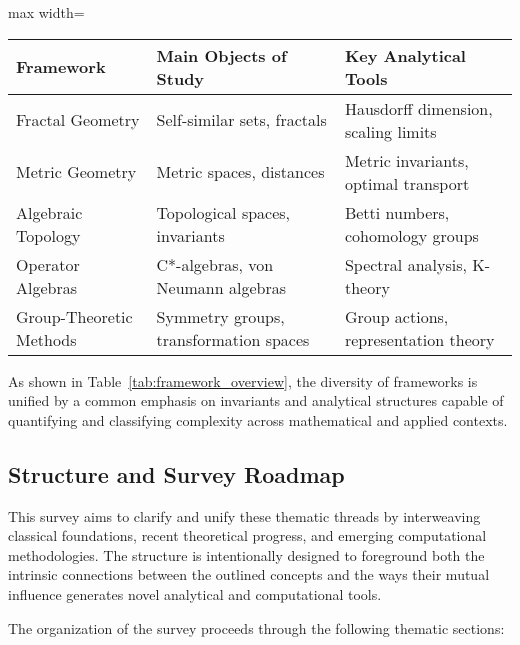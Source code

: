 \documentclass[sigconf]{acmart}
\begin{document}
\begin{table*}[htbp]
\centering
\caption{Principal Frameworks, Core Objects, and Key Analytical Tools}
\label{tab:framework_overview}
\begin{adjustbox}{max width=\textwidth}
\begin{tabular}{lll}
\toprule
\textbf{Framework}         & \textbf{Main Objects of Study}         & \textbf{Key Analytical Tools}             \\
\midrule
Fractal Geometry           & Self-similar sets, fractals            & Hausdorff dimension, scaling limits       \\
Metric Geometry            & Metric spaces, distances                & Metric invariants, optimal transport      \\
Algebraic Topology         & Topological spaces, invariants          & Betti numbers, cohomology groups          \\
Operator Algebras          & C*-algebras, von Neumann algebras       & Spectral analysis, K-theory               \\
Group-Theoretic Methods    & Symmetry groups, transformation spaces  & Group actions, representation theory      \\
\bottomrule
\end{tabular}
\end{adjustbox}
\end{table*}

As shown in Table~\ref{tab:framework_overview}, the diversity of frameworks is unified by a common emphasis on invariants and analytical structures capable of quantifying and classifying complexity across mathematical and applied contexts.

\subsection{Structure and Survey Roadmap}

This survey aims to clarify and unify these thematic threads by interweaving classical foundations, recent theoretical progress, and emerging computational methodologies. The structure is intentionally designed to foreground both the intrinsic connections between the outlined concepts and the ways their mutual influence generates novel analytical and computational tools.

The organization of the survey proceeds through the following thematic sections:
\end{document}
